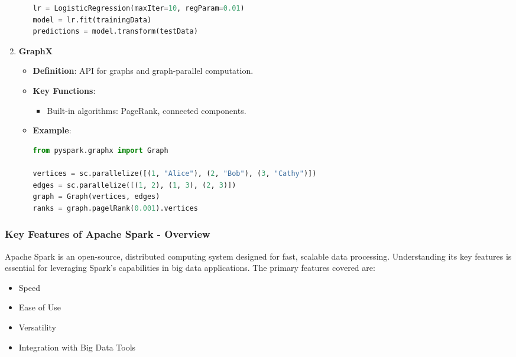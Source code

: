 \documentclass{beamer}
\begin{document}
\begin{frame}[fragile]
\begin{enumerate}
\begin{itemize}
\begin{lstlisting}[language=Python]
lr = LogisticRegression(maxIter=10, regParam=0.01)
model = lr.fit(trainingData)
predictions = model.transform(testData)
                \end{lstlisting}
            \end{itemize}

        \item \textbf{GraphX}
            \begin{itemize}
                \item \textbf{Definition}: API for graphs and graph-parallel computation.
                \item \textbf{Key Functions}:
                    \begin{itemize}
                        \item Built-in algorithms: PageRank, connected components.
                    \end{itemize}
                \item \textbf{Example}:
                \begin{lstlisting}[language=Python]
from pyspark.graphx import Graph

vertices = sc.parallelize([(1, "Alice"), (2, "Bob"), (3, "Cathy")])
edges = sc.parallelize([(1, 2), (1, 3), (2, 3)])
graph = Graph(vertices, edges)
ranks = graph.pagelRank(0.001).vertices
                \end{lstlisting}
            \end{itemize}
    \end{enumerate}
\end{frame}

\begin{frame}
    \frametitle{Key Features of Apache Spark - Overview}
    Apache Spark is an open-source, distributed computing system designed for fast, scalable data processing. 
    Understanding its key features is essential for leveraging Spark's capabilities in big data applications. 
    The primary features covered are:
    \begin{itemize}
        \item Speed
        \item Ease of Use
        \item Versatility
        \item Integration with Big Data Tools
    \end{itemize}
\end{frame}
\end{document}

